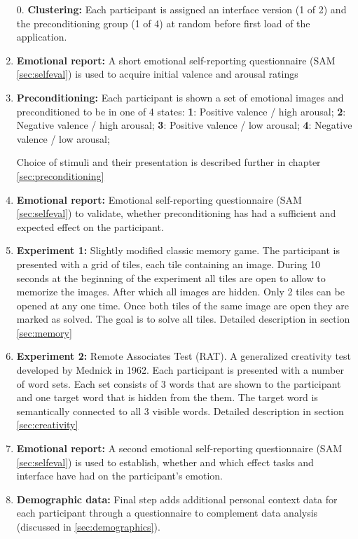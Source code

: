 	\begin{enumerate}
		
		\item[0.] \textbf{Clustering:} Each participant is assigned an interface version (1 of 2) and the preconditioning group (1 of 4) at random before first load of the application.
		
		\item \textbf{Emotional report:} A short emotional self-reporting questionnaire (SAM \ref{sec:selfeval}) is used to acquire initial valence and arousal ratings
		
		\item \textbf{Preconditioning:} Each participant is shown a set of emotional images and preconditioned to be in one of 4 states:
			\textbf{1}: Positive valence / high arousal;
			\textbf{2}: Negative valence / high arousal;
			\textbf{3}: Positive valence / low arousal;
			\textbf{4}: Negative valence / low arousal;
			
		Choice of stimuli and their presentation is described further in chapter \ref{sec:preconditioning}
			
		\item \textbf{Emotional report:} Emotional self-reporting questionnaire (SAM \ref{sec:selfeval}) to validate, whether preconditioning has had a sufficient and expected effect on the participant.
		
		\item \textbf{Experiment 1:} Slightly modified classic memory game. The participant is presented with a grid of tiles, each tile containing an image. During 10 seconds at the beginning of the experiment all tiles are open to allow to memorize the images. After which all images are hidden. Only 2 tiles can be opened at any one time. Once both tiles of the same image are open they are marked as solved. The goal is to solve all tiles. Detailed description in section \ref{sec:memory}
		
		\item \textbf{Experiment 2:} Remote Associates Test (RAT). A generalized creativity test developed by Mednick \cite{Mednick1962} in 1962. Each participant is presented with a number of word sets. Each set consists of 3 words that are shown to the participant and one target word that is hidden from the them. The target word is semantically connected to all 3 visible words. Detailed description in section \ref{sec:creativity}
		
		\item \textbf{Emotional report:} A second emotional self-reporting questionnaire (SAM \ref{sec:selfeval}) is used to establish, whether and which effect tasks and interface have had on the participant's emotion.
		
		\item \textbf{Demographic data:} Final step adds additional personal context data for each participant through a questionnaire to complement data analysis (discussed in \ref{sec:demographics}).
		
	\end{enumerate}
	

